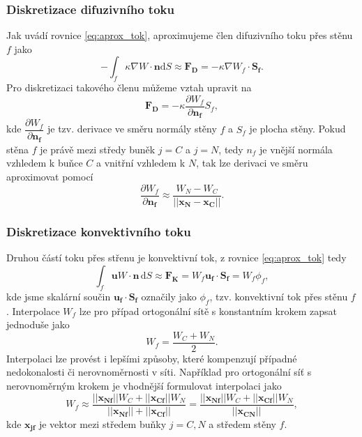 \subsubsection{Diskretizace difuzivního toku}
Jak uvádí rovnice \ref{eq:aprox_tok}, aproximujeme člen difuzivního toku přes stěnu $f$ jako
\begin{equation*}
-\int_f \kappa \nabla W \cdot \mathbf{n}\mathrm{d}S \approx \mathbf{F_D} = -\kappa \nabla W_f \cdot \mathbf{S_f}.
\end{equation*}
Pro diskretizaci takového členu můžeme vztah upravit na
\begin{equation*}
\mathbf{F_D} = -\kappa \dfrac{\partial W_f}{\partial \mathbf{n_f}} S_f,
\end{equation*}
kde $\dfrac{\partial W_f}{\partial \mathbf{n_f}}$ je tzv. derivace ve směru normály stěny $f$ a $S_f$ je plocha stěny. Pokud stěna $f$ je právě mezi středy buněk $ j=C $ a $ j=N $, tedy $ n_f $ je vnější normála vzhledem k buňce $ C $ a vnitřní vzhledem k $ N $, tak lze derivaci ve směru aproximovat pomocí 
\begin{equation*}
\dfrac{\partial W_f}{\partial \mathbf{n_f}} \approx \dfrac{W_N-W_C}{||\mathbf{x_N}-\mathbf{x_C}||}.
\end{equation*}

\subsubsection{Diskretizace konvektivního toku}
Druhou částí toku přes střenu je konvektivní tok, z rovnice \ref{eq:aprox_tok} tedy
\begin{equation*}
\int_f \mathbf{u}W\cdot \mathbf{n}\, \mathrm{d}S
\approx
\mathbf{F_K}
=
W_f \mathbf{u_f}\cdot \mathbf{S_f}=W_f\phi_f,
\end{equation*}
kde jsme skalární součin $ \mathbf{u_f}\cdot \mathbf{S_f} $ označily jako $ \phi_f $, tzv. konvektivní tok přes stěnu $ f $. Interpolace $ W_f $ lze pro případ ortogonální sítě s konstantním krokem zapsat jednoduše jako
\begin{equation*}
W_f = \dfrac{W_C+W_N}{2}.
\end{equation*}
Interpolaci lze provést i lepšími způsoby, které kompenzují případné nedokonalosti či nerovnoměrnosti v síti. Například pro ortogonální síť s nerovnoměrným krokem je vhodnější formulovat interpolaci jako
\begin{equation*}
W_f \approx \dfrac{||\mathbf{x_{Nf}}|| W_C + ||\mathbf{x_{Cf}}|| W_N }
{||\mathbf{x_{Nf}}|| + ||\mathbf{x_{Cf}}||}
= 
\dfrac{||\mathbf{x_{Nf}}|| W_C + ||\mathbf{x_{Cf}}|| W_N }
{||\mathbf{x_{CN}}||},
\end{equation*}
kde $ \mathbf{x_{jf}} $ je vektor mezi středem buňky $ j=C,N $ a středem stěny $ f $.

